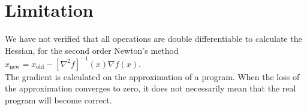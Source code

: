 \documentclass{article}
\begin{document}
\section*{Limitation}
We have not verified that all operations are double differentiable to calculate the Hessian, for the second order Newton's method $x_{\mathrm{new}} = x_{\mathrm{old}} - [\nabla^2 f]^{-1}(x) \nabla f(x)$.\\
The gradient is calculated on the approximation of a program. When the loss of the approximation converges to zero, it does not necessarily mean that the real program will become correct.


\end{document}
